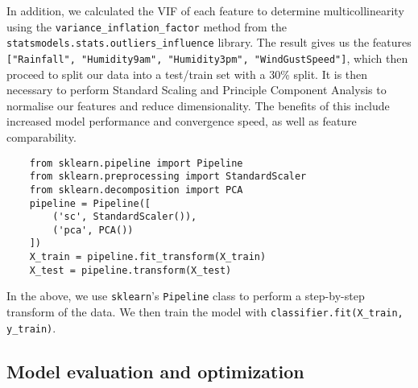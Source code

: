 \documentclass[10pt]{article}
\begin{document}
\noindent In addition, we calculated the VIF of each feature to determine multicollinearity using the \texttt{variance\_inflation\_factor} method from the \texttt{statsmodels.stats.outliers\_influence} library. The result gives us the features \texttt{["Rainfall", "Humidity9am", "Humidity3pm", "WindGustSpeed"]}, which then proceed to split our data into a test/train set with a 30\% split. It is then necessary to perform Standard Scaling and Principle Component Analysis to normalise our features and reduce dimensionality. The benefits of this include increased model performance and convergence speed, as well as feature comparability.
\begin{verbatim}
    from sklearn.pipeline import Pipeline
    from sklearn.preprocessing import StandardScaler
    from sklearn.decomposition import PCA
    pipeline = Pipeline([
        ('sc', StandardScaler()),
        ('pca', PCA())
    ])
    X_train = pipeline.fit_transform(X_train)
    X_test = pipeline.transform(X_test) 
\end{verbatim}

\noindent In the above, we use \texttt{sklearn}'s \texttt{Pipeline} class to perform a step-by-step transform of the data. We then train the model with \texttt{classifier.fit(X\_train, y\_train)}.

\subsection{Model evaluation and optimization}
\end{document}
